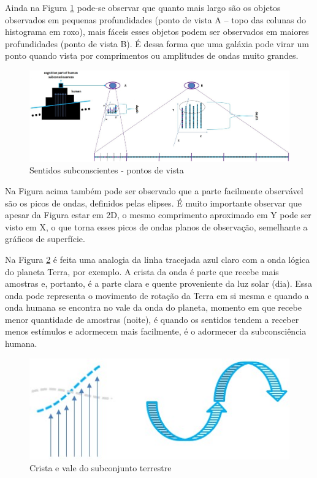 Ainda na Figura \ref{fig:consciousness_amplitude_viewpoint}  pode-se observar que quanto mais largo são os objetos observados em pequenas profundidades (ponto de vista A – topo das colunas do histograma em roxo), mais fáceis esses objetos podem ser observados em maiores profundidades (ponto de vista B). É dessa forma que uma galáxia pode virar um ponto quando vista por comprimentos ou amplitudes de ondas muito grandes.
	\begin{figure}[H]
	\caption{Sentidos subconscientes - pontos de vista}
	\label{fig:consciousness_amplitude_viewpoint}
	\centering
	\includegraphics[scale=.4]{sections/images/consciousness_amplitude_viewpoint.jpg}
	\end{figure}

Na Figura acima também pode ser observado que a parte facilmente observável são os picos de ondas, definidos pelas elipses. É muito importante observar que apesar da Figura estar em 2D, o mesmo comprimento aproximado em Y pode ser visto em X, o que torna esses picos de ondas planos de observação, semelhante a gráficos de superfície.

Na Figura \ref{fig:consciousness_amplitude_crest_valley} é feita uma analogia da linha tracejada azul claro com a onda lógica do planeta Terra, por exemplo. A crista da onda é parte que recebe mais amostras e, portanto, é a parte clara e quente proveniente da luz solar (dia). Essa onda pode representa o movimento de rotação da Terra em si mesma e quando a onda humana se encontra no vale da onda do planeta, momento em que recebe menor quantidade de amostras (noite), é quando os sentidos tendem a receber menos estímulos e adormecem mais facilmente, é o adormecer da subconsciência humana.
	\begin{figure}[H]
	\caption{Crista e vale do subconjunto terrestre}
	\label{fig:consciousness_amplitude_crest_valley}
	\centering
	\includegraphics[scale=.6]{sections/images/consciousness_amplitude_crest_valley.jpg}
	\end{figure}

